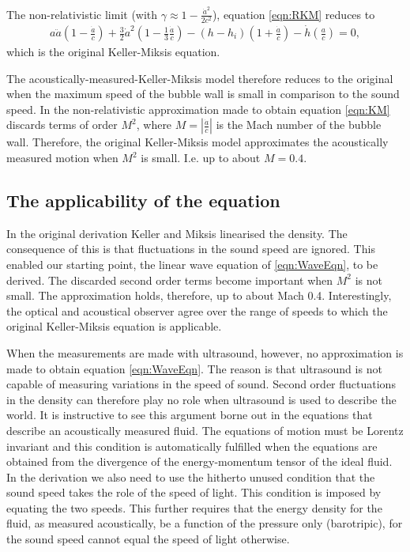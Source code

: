 \documentclass[10pt, fleqn,draft,showtrims,oldfontcommands]{article} %
\newcommand{\eqnref}[1]{\ref{eqn:#1}}
\newcommand{\lr}[1]{\left( #1 \right)}
\newcommand{\abs}[1]{\left| #1 \right|}
\begin{document}
 The  non-relativistic limit (with $\gamma \approx 1 - \frac{{\dot a}^2}{2c^2}$), equation \eqnref{RKM} reduces to
\begin{align}
  a \ddot a\lr{1 - \frac{\dot a}{c}}+ \frac{3}{2} {\dot a}^2\lr{1- \frac{1}{3}\frac{\dot a }{c}}
    - \lr{h - h_i}\lr{1 + \frac{\dot a}{c}}
  -  \dot h \lr{\frac{a}{c}}
= 0, \label{eqn:KM}
\end{align}
which is the original Keller-Miksis equation\cite{Hoff2001}.

The acoustically-measured-Keller-Miksis model therefore reduces to the original when the maximum speed of the bubble wall is small in comparison to the sound speed.
In the non-relativistic approximation made to obtain equation \eqnref{KM} discards terms of order $M^2$, 
where  $M = \abs{\frac{\dot a}{c}}$ is the Mach number of the bubble wall.
Therefore, the original Keller-Miksis model approximates the acoustically measured motion when $M^2$ is small.
I.e. %
up to about $M=0.4$.


\subsection{The applicability of the equation}
In the original derivation Keller and Miksis linearised the density. 
The consequence of this is that fluctuations in the sound speed are ignored.
This enabled our starting point, the linear wave equation of  \eqnref{WaveEqn}, to be derived.
The discarded second order terms become important when $M^2$ is not small.
The approximation holds, therefore, up to about Mach 0.4.
Interestingly,  the optical and acoustical observer
agree over the range of speeds to which the original Keller-Miksis equation is applicable.

When the measurements are made with ultrasound,
however, 
no approximation is made to obtain equation \eqnref{WaveEqn}.
The reason is that  ultrasound is not capable of  measuring variations in the speed of sound.
Second order fluctuations in the density  can therefore play no role when ultrasound is used to describe the world.
It is instructive to see this argument borne out in the equations that describe an acoustically measured fluid.
The equations of motion must  be Lorentz invariant and this condition  is automatically fulfilled  when  the equations 
are obtained from the divergence of the energy-momentum tensor of the ideal fluid.
In the derivation we also need to use the hitherto unused  condition
that the sound speed takes the role  of the speed of light.
This condition is imposed by equating the two speeds.
This further requires that the energy density for the fluid, as measured acoustically, be a function of the pressure only (barotripic),
for the sound speed cannot equal the speed of light otherwise\cite{Taub1978}.
\end{document}

